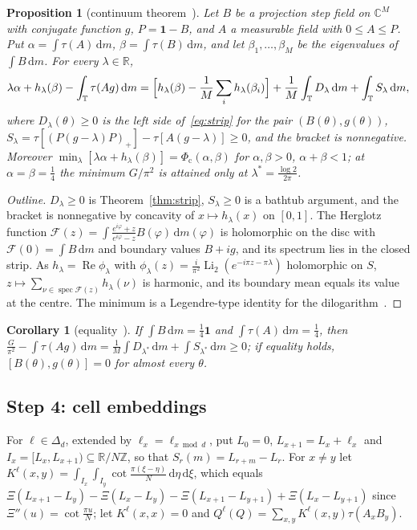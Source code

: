 \documentclass[11pt]{article}
\newtheorem{proposition}[lemma]{Proposition}
\newtheorem{corollary}[lemma]{Corollary}
\theoremstyle{remark}
\numberwithin{equation}{section}
\newcommand{\Z}{\mathbb{Z}}
\newcommand{\R}{\mathbb{R}}
\newcommand{\C}{\mathbb{C}}
\newcommand{\T}{\mathbb{T}}
\newcommand{\spec}{\operatorname{spec}}
\renewcommand{\Re}{\operatorname{Re}}
\newcommand{\Li}{\operatorname{Li}_2}
\newcommand{\one}{\mathbf{1}}
\newcommand{\Phic}{\Phi_{\mathrm c}}
\newcommand{\dd}{\,\mathrm{d}}
\begin{document}
\begin{proposition}[continuum theorem~{\cite[Theorem~4.2]{MSmath}}]\label{prop:continuum}
Let $B$ be a projection step field on $\C^M$ with conjugate function $g$, $P=\one-B$, and $A$ a measurable field with
$0\le A\le P$. Put $\alpha=\int\tau(A)\dd m$, $\beta=\int\tau(B)\dd m$, and let $\beta_1,\dots,\beta_M$ be the
eigenvalues of $\int B\dd m$. For every $\lambda\in\R$,
\[
\lambda\alpha+h_\lambda(\beta)-\int_\T\tau(Ag)\dd m=\Bigl[h_\lambda(\beta)-\frac1M\sum_ih_\lambda(\beta_i)\Bigr]
+\frac1M\int_\T D_\lambda\dd m+\int_\T S_\lambda\dd m ,
\]
where $D_\lambda(\theta)\ge0$ is the left side of~\eqref{eq:strip} for the pair $(B(\theta),g(\theta))$,
$S_\lambda=\tau[(P(g-\lambda)P)_+]-\tau[A(g-\lambda)]\ge0$, and the bracket is nonnegative. Moreover
$\min_\lambda[\lambda\alpha+h_\lambda(\beta)]=\Phic(\alpha,\beta)$ for $\alpha,\beta>0$, $\alpha+\beta<1$; at
$\alpha=\beta=\frac14$ the minimum $G/\pi^2$ is attained only at $\lambda^*=\frac{\log2}{2\pi}$.
\end{proposition}

\begin{proof}[Outline]
$D_\lambda\ge0$ is Theorem~\ref{thm:strip}, $S_\lambda\ge0$ is a bathtub argument, and the bracket is nonnegative by
concavity of $x\mapsto h_\lambda(x)$ on $[0,1]$. The Herglotz function $\mathcal F(z)=\int\frac{e^{i\varphi}+z}{e^{i\varphi}-z}B(\varphi)\dd m(\varphi)$
is holomorphic on the disc with $\mathcal F(0)=\int B\dd m$ and boundary values $B+ig$, and its spectrum lies in the closed
strip. As $h_\lambda=\Re\phi_\lambda$ with $\phi_\lambda(z)=\frac i{\pi^2}\Li(e^{-i\pi z-\pi\lambda})$ holomorphic on $S$,
$z\mapsto\sum_{\nu\in\spec\mathcal F(z)}h_\lambda(\nu)$ is harmonic, and its boundary mean equals its value at the
centre. The minimum is a Legendre-type identity for the dilogarithm~\cite[Lemma~4.4]{MSmath}.
\end{proof}

\begin{corollary}[equality~{\cite[Corollary~4.5]{MSmath}}]\label{cor:equality}
If $\int B\dd m=\frac14\one$ and $\int\tau(A)\dd m=\frac14$, then $\frac G{\pi^2}-\int\tau(Ag)\dd m=\frac1M\int
D_{\lambda^*}\dd m+\int S_{\lambda^*}\dd m\ge0$; if equality holds, $[B(\theta),g(\theta)]=0$ for almost every $\theta$.
\end{corollary}

\subsection{Step 4: cell embeddings}\label{subsec:cells}
For $\ell\in\Delta_d$, extended by $\ell_x=\ell_{x\bmod d}$, put $L_0=0$, $L_{x+1}=L_x+\ell_x$ and
$I_x=[L_x,L_{x+1})\subseteq\R/N\Z$, so that $S_r(m)=L_{r+m}-L_r$. For $x\ne y$ let
$K^\ell(x,y)=\int_{I_x}\int_{I_y}\cot\frac{\pi(\xi-\eta)}N\dd\eta\dd\xi$, which equals
$\Xi(L_{x+1}-L_y)-\Xi(L_x-L_y)-\Xi(L_{x+1}-L_{y+1})+\Xi(L_x-L_{y+1})$ since $\Xi''(u)=\cot\frac{\pi u}N$; let
$K^\ell(x,x)=0$ and $Q^\ell(Q)=\sum_{x,y}K^\ell(x,y)\tau(A_xB_y)$.
\end{document}
